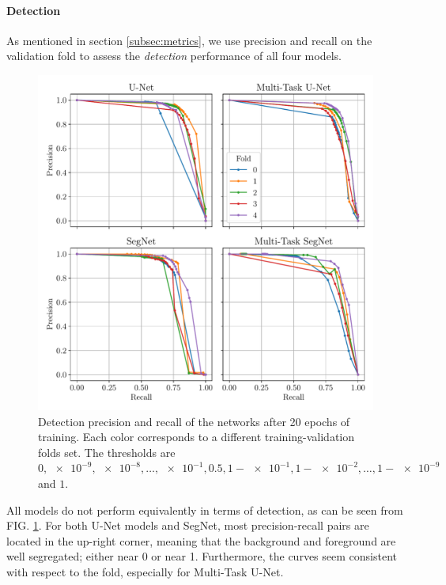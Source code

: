 \documentclass[twocolumn,superscriptaddress,aps,nofootinbib]{revtex4-1}
\begin{document}
\vspace{1em}

\paragraph{Detection}

As mentioned in section \ref{subsec:metrics}, we use precision and recall on the validation fold to assess the \emph{detection} performance of all four models.

\begin{figure}[h]
    \centering
    \vspace{-1em}
    \includegraphics[width=\columnwidth]{resources/pdf/detection_pr.pdf}
    \vspace{-2em}
    \caption{Detection precision and recall of the networks after 20 epochs of training. Each color corresponds to a different training-validation folds set. The thresholds are $0, \num{e-9}, \num{e-8}, \dots, \num{e-1}, 0.5, 1 - \num{e-1}, 1 - \num{e-2}, \dots, 1 - \num{e-9}$ and $1$.}
    \label{fig:detection_pr}
\end{figure}

All models do not perform equivalently in terms of detection, as can be seen from FIG. \ref{fig:detection_pr}. For both U-Net models and SegNet, most precision-recall pairs are located in the up-right corner, meaning that the background and foreground are well segregated; either near 0 or near 1. Furthermore, the curves seem consistent with respect to the fold, especially for Multi-Task U-Net.
\end{document}
